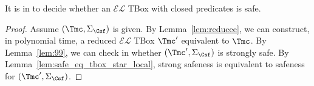 \documentclass{lmcs}
\theoremstyle{definition}
\begin{document}
\begin{thm}
It is in \ptime to decide whether an $\mathcal{EL}$ TBox with closed predicates is safe.
\end{thm}
\begin{proof}
Assume $(\Tmc,\Sigma_{\Csf})$ is given. By Lemma~\ref{lem:reducee}, we can construct, in polynomial time,
a reduced $\mathcal{EL}$ TBox $\Tmc'$ equivalent to $\Tmc$. By Lemma~\ref{lem:99}, we can check in
\ptime whether $(\Tmc',\Sigma_{\Csf})$ is strongly safe. By Lemma~\ref{lem:safe_eq_tbox_star_local}, strong safeness is
equivalent to safeness for $(\Tmc',\Sigma_{\Csf})$.
\end{proof}


\end{document}
